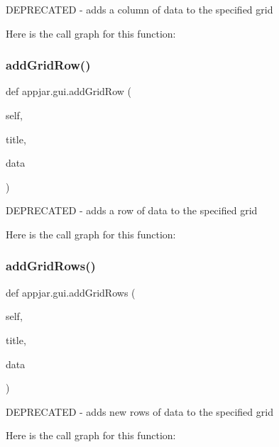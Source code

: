 \begin{DoxyVerb}DEPRECATED - adds a column of data to the specified grid \end{DoxyVerb}
 Here is the call graph for this function\+:
\mbox{\label{classappjar_1_1gui_a9472f1b4945164bfc7f224fa83c49c41}} 
\subsubsection{\texorpdfstring{add\+Grid\+Row()}{addGridRow()}}
{\footnotesize\ttfamily def appjar.\+gui.\+add\+Grid\+Row (\begin{DoxyParamCaption}\item[{}]{self,  }\item[{}]{title,  }\item[{}]{data }\end{DoxyParamCaption})}

\begin{DoxyVerb}DEPRECATED - adds a row of data to the specified grid \end{DoxyVerb}
 Here is the call graph for this function\+:
\mbox{\label{classappjar_1_1gui_a0a0918e83cbbe41c78e46b5d17ad32ee}} 
\subsubsection{\texorpdfstring{add\+Grid\+Rows()}{addGridRows()}}
{\footnotesize\ttfamily def appjar.\+gui.\+add\+Grid\+Rows (\begin{DoxyParamCaption}\item[{}]{self,  }\item[{}]{title,  }\item[{}]{data }\end{DoxyParamCaption})}

\begin{DoxyVerb}DEPRECATED - adds new rows of data to the specified grid \end{DoxyVerb}
 Here is the call graph for this function\+:
\mbox{\label{classappjar_1_1gui_a6056aeaae732dea363335e4603cdf530}} 
